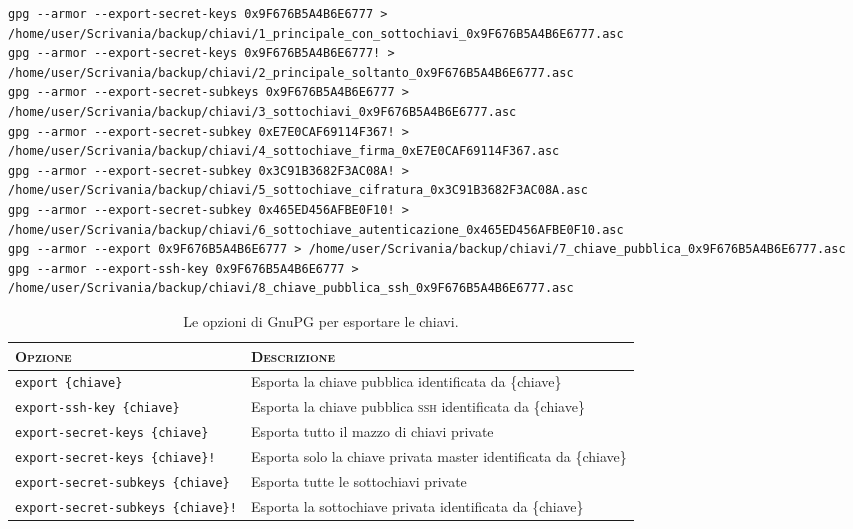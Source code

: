 \begin{lstlisting}
gpg --armor --export-secret-keys 0x9F676B5A4B6E6777 > /home/user/Scrivania/backup/chiavi/1_principale_con_sottochiavi_0x9F676B5A4B6E6777.asc
gpg --armor --export-secret-keys 0x9F676B5A4B6E6777! > /home/user/Scrivania/backup/chiavi/2_principale_soltanto_0x9F676B5A4B6E6777.asc
gpg --armor --export-secret-subkeys 0x9F676B5A4B6E6777 > /home/user/Scrivania/backup/chiavi/3_sottochiavi_0x9F676B5A4B6E6777.asc
gpg --armor --export-secret-subkey 0xE7E0CAF69114F367! > /home/user/Scrivania/backup/chiavi/4_sottochiave_firma_0xE7E0CAF69114F367.asc
gpg --armor --export-secret-subkey 0x3C91B3682F3AC08A! > /home/user/Scrivania/backup/chiavi/5_sottochiave_cifratura_0x3C91B3682F3AC08A.asc
gpg --armor --export-secret-subkey 0x465ED456AFBE0F10! > /home/user/Scrivania/backup/chiavi/6_sottochiave_autenticazione_0x465ED456AFBE0F10.asc
gpg --armor --export 0x9F676B5A4B6E6777 > /home/user/Scrivania/backup/chiavi/7_chiave_pubblica_0x9F676B5A4B6E6777.asc
gpg --armor --export-ssh-key 0x9F676B5A4B6E6777 > /home/user/Scrivania/backup/chiavi/8_chiave_pubblica_ssh_0x9F676B5A4B6E6777.asc
\end{lstlisting}

\begin{table}
    \centering
	\begin{tabularx}{\textwidth}{l p{5cm}}
 		\toprule
		\textsc{Opzione} & \textsc{Descrizione} \\
		\midrule
		\texttt{export \{chiave\}}                 & Esporta la chiave pubblica identificata da \{chiave\}              \\
		\texttt{export-ssh-key \{chiave\}}         & Esporta la chiave pubblica \textsc{ssh} identificata da \{chiave\} \\
		\texttt{export-secret-keys \{chiave\}}     & Esporta tutto il mazzo di chiavi private                           \\
		\texttt{export-secret-keys \{chiave\}!}    & Esporta solo la chiave privata master identificata da \{chiave\}   \\
		\texttt{export-secret-subkeys \{chiave\}}  & Esporta tutte le sottochiavi private                               \\
		\texttt{export-secret-subkeys \{chiave\}!} & Esporta la sottochiave privata identificata da \{chiave\}          \\
		\bottomrule
	\end{tabularx}
	\caption{Le opzioni di GnuPG per esportare le chiavi.}
	\label{table:exportkeys}
\end{table}

